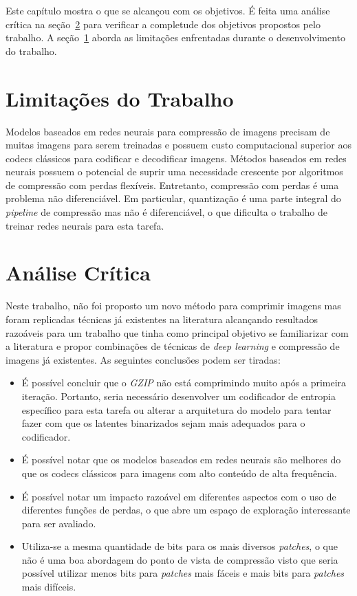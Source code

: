 Este capítulo mostra o que se alcançou com os objetivos. É feita uma análise crítica na seção~\ref{sec:analise} para verificar a completude dos objetivos propostos pelo trabalho. A seção~\ref{sec:limitacoes} aborda as limitações enfrentadas durante o desenvolvimento do trabalho.

\section{Limitações do Trabalho}
\label{sec:limitacoes}
Modelos baseados em redes neurais para compressão de imagens precisam de muitas imagens para serem treinadas e possuem custo computacional superior aos codecs clássicos para codificar e decodificar imagens. Métodos baseados em redes neurais possuem o potencial de suprir uma necessidade crescente por algoritmos de compressão com perdas flexíveis. Entretanto, compressão com perdas é uma problema não diferenciável. Em particular, quantização é uma parte integral do \textit{pipeline} de compressão mas não é diferenciável, o que dificulta o trabalho de treinar redes neurais para esta tarefa.
\section{Análise Crítica}
\label{sec:analise}
Neste trabalho, não foi proposto um novo método para comprimir imagens mas foram replicadas técnicas já existentes na literatura alcançando resultados razoáveis para um trabalho que tinha como principal objetivo se familiarizar com a literatura e propor combinações de técnicas de \textit{deep learning} e compressão de imagens já existentes. As seguintes conclusões podem ser tiradas:
\begin{itemize}
    \item É possível concluir que o \textit{GZIP} não está comprimindo muito após a primeira iteração. Portanto, seria necessário desenvolver um codificador de entropia específico para esta tarefa ou alterar a arquitetura do modelo para tentar fazer com que os latentes binarizados sejam mais adequados para o codificador.
    \item É possível notar que os modelos baseados em redes neurais são melhores do que os codecs clássicos para imagens com alto conteúdo de alta frequência. 
    \item É possível notar um impacto razoável em diferentes aspectos com o uso de diferentes funções de perdas, o que abre um espaço de exploração interessante para ser avaliado.
    \item Utiliza-se a mesma quantidade de bits para os mais diversos \textit{patches}, o que não é uma boa abordagem do ponto de vista de compressão visto que seria possível utilizar menos bits para \textit{patches} mais fáceis e mais bits para \textit{patches} mais difíceis.
\end{itemize}

